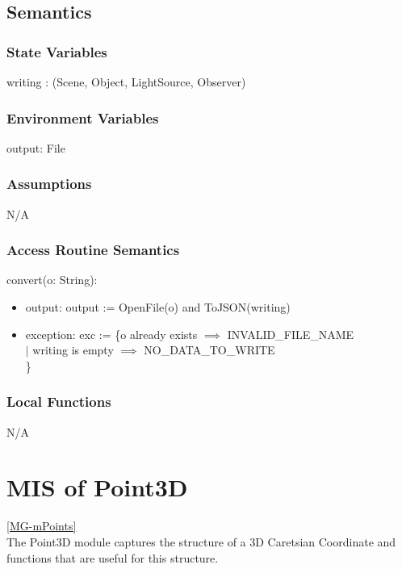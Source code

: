 \documentclass[12pt, titlepage]{article}
\begin{document}
\subsection{Semantics}
\subsubsection{State Variables}
writing : (Scene, Object, LightSource, Observer)%

\subsubsection{Environment Variables}
output: File

\subsubsection{Assumptions}
N/A

\subsubsection{Access Routine Semantics}
\noindent convert(o: String):
\begin{itemize}
	\item output: output := OpenFile(o) and ToJSON(writing)
	\item exception: exc := \{o already exists $\implies$ INVALID\_FILE\_NAME\\
	$|$ writing is empty $\implies$ NO\_DATA\_TO\_WRITE \\
	\}
\end{itemize}

\subsubsection{Local Functions}
N/A

\newpage

\section{MIS of Point3D} \ref{MG-mPoints} \\
The Point3D module captures the structure of a 3D Caretsian Coordinate and 
functions that are useful for this structure.
\end{document}
